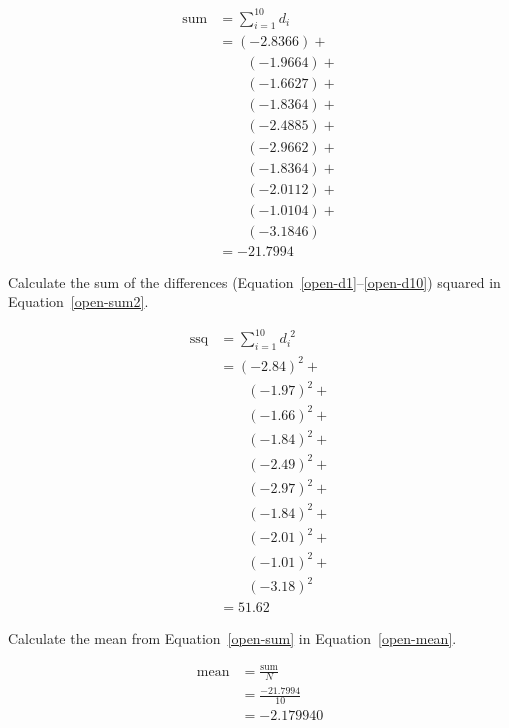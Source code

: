 \documentclass[twocolumn]{article}
\begin{document}
\begin{align}
\text{sum} &= \sum_{i=1}^{10} d_{i} \nonumber\\
 &= (-2.8366) + \nonumber\\
 &\quad\quad (-1.9664) + \nonumber\\
 &\quad\quad (-1.6627) + \nonumber\\
 &\quad\quad (-1.8364) + \nonumber\\
 &\quad\quad (-2.4885) + \nonumber\\
 &\quad\quad (-2.9662) + \nonumber\\
 &\quad\quad (-1.8364) + \nonumber\\
 &\quad\quad (-2.0112) + \nonumber\\
 &\quad\quad (-1.0104) + \nonumber\\
 &\quad\quad (-3.1846) \nonumber\\
 &= -21.7994 \label{open-sum}
\end{align}

Calculate the sum of the differences (Equation~\ref{open-d1}--\ref{open-d10}) squared in Equation~\ref{open-sum2}.

\begin{align}
\text{ssq} &= \sum_{i=1}^{10} d_{i}^{\phantom{i}2} \nonumber\\
 &= (-2.84)^2 + \nonumber\\
 &\quad\quad (-1.97)^2 + \nonumber\\
 &\quad\quad (-1.66)^2 + \nonumber\\
 &\quad\quad (-1.84)^2 + \nonumber\\
 &\quad\quad (-2.49)^2 + \nonumber\\
 &\quad\quad (-2.97)^2 + \nonumber\\
 &\quad\quad (-1.84)^2 + \nonumber\\
 &\quad\quad (-2.01)^2 + \nonumber\\
 &\quad\quad (-1.01)^2 + \nonumber\\
 &\quad\quad (-3.18)^2 \nonumber\\
 &= 51.62 \label{open-sum2}
\end{align}

Calculate the mean from Equation~\ref{open-sum} in Equation~\ref{open-mean}.

\begin{align}
\text{mean} &= \frac{\text{sum}}{N} \nonumber\\
 &= \frac{-21.7994}{10} \nonumber\\
 &= -2.179940 \label{open-mean}
\end{align}
\end{document}
